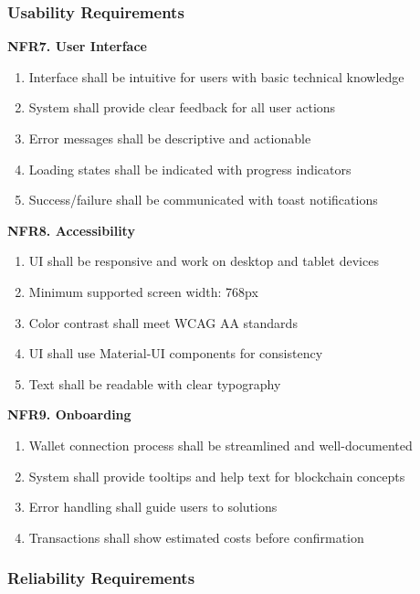 \documentclass[a4paper,13pt,twoside]{report}
\theoremstyle{definition}
\begin{document}
\subsubsection{Usability Requirements}

\textbf{NFR7. User Interface}

\begin{enumerate}
    \item Interface shall be intuitive for users with basic technical knowledge
    \item System shall provide clear feedback for all user actions
    \item Error messages shall be descriptive and actionable
    \item Loading states shall be indicated with progress indicators
    \item Success/failure shall be communicated with toast notifications
\end{enumerate}

\textbf{NFR8. Accessibility}

\begin{enumerate}
    \item UI shall be responsive and work on desktop and tablet devices
    \item Minimum supported screen width: 768px
    \item Color contrast shall meet WCAG AA standards
    \item UI shall use Material-UI components for consistency
    \item Text shall be readable with clear typography
\end{enumerate}

\textbf{NFR9. Onboarding}

\begin{enumerate}
    \item Wallet connection process shall be streamlined and well-documented
    \item System shall provide tooltips and help text for blockchain concepts
    \item Error handling shall guide users to solutions
    \item Transactions shall show estimated costs before confirmation
\end{enumerate}

\subsubsection{Reliability Requirements}
\end{document}
